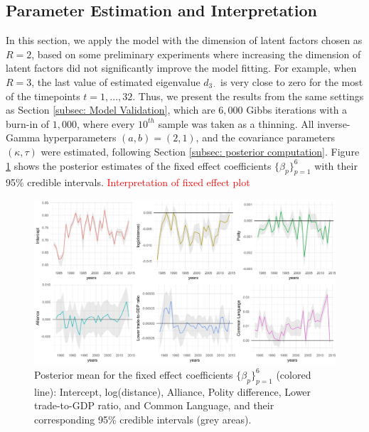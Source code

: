 \documentclass[a4paper]{article}
\begin{document}
\subsection{Parameter Estimation and Interpretation}\label{subsec: UNresult}
In this section, we apply the model with the dimension of latent factors chosen as $R=2$, based on some preliminary experiments where increasing the dimension of latent factors did not significantly improve the model fitting. For example, when $R=3$, the last value of estimated eigenvalue $d_{3\cdot}$ is very close to zero for the most of the timepoints $t=1,...,32$. Thus, we present the results from the same settings as Section \ref{subsec: Model Validation}, which are $6,000$ Gibbs iterations with a burn-in of $1,000$, where every $10^{th}$ sample was taken as a thinning. All inverse-Gamma hyperparameters $(a, b) = (2, 1)$, and the covariance parameters $(\kappa, \tau)$ were estimated, following Section \ref{subsec: posterior computation}. Figure \ref{figure:interceptplot} shows the posterior estimates of the fixed effect coefficients $\{\beta_p\}_{p=1}^6$ with their 95\% credible intervals. \textcolor{red}{Interpretation of fixed effect plot} 
\begin{figure}[ht]
	\begin{center}
		\includegraphics[width=1\textwidth]{plots/betaplot_full.pdf}
	\end{center}
	 	\caption {Posterior mean for the fixed effect coefficients $\{\beta_p\}_{p=1}^6$  (colored line): Intercept, log(distance), Alliance, Polity difference, Lower trade-to-GDP ratio, and Common Language, and their corresponding 95\% credible intervals (grey areas). }
	\label{figure:interceptplot}
\end{figure}
 \newpage
\end{document}

